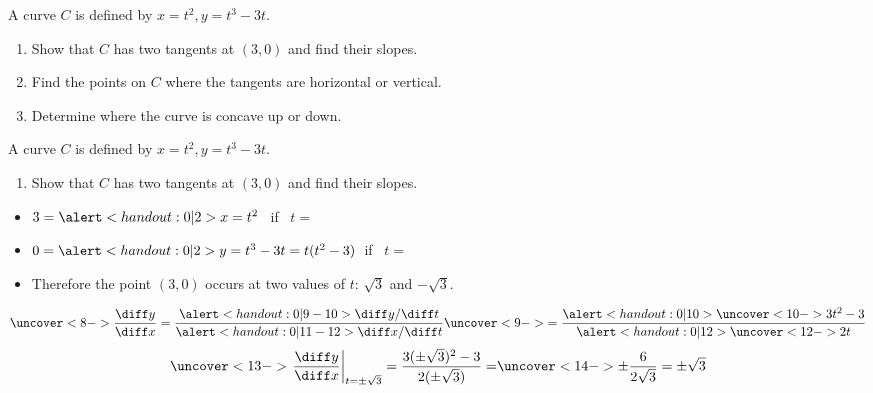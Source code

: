\begin{frame}[t]
\begin{example}[Example 1, p. 667]
A curve $C$ is defined by $x = t^2, y = t^3 - 3t$.
\begin{enumerate}
\item  Show that $C$ has two tangents at $(3,0)$ and find their slopes.
\item  Find the points on $C$ where the tangents are horizontal or vertical.
\item  Determine where the curve is concave up or down.
\end{enumerate}
\end{example}
\end{frame}




\begin{frame}[t]
\begin{example}[Example 1, p. 667]
A curve $C$ is defined by \alert<handout:0| 2>{$x = t^2, y = t^3 - 3t$}.
\begin{enumerate}
\item  Show that $C$ has two tangents at $(3,0)$ and find their slopes.
\end{enumerate}
\begin{itemize}
\item<2-| alert@3-4>  $3 = \alert<handout:0| 2>{x = t^2}$ \ if \ $t = $ 
\item<2-| alert@5-6>  $0 = \alert<handout:0| 2>{y = t^3 - 3t} = t(t^2-3)$\  if \ $t = $ 
\item<7->  Therefore the point $(3,0)$ occurs at two values of $t$: $\sqrt{3}$ and $-\sqrt{3}$.
\end{itemize}
\abovedisplayskip=0pt
\belowdisplayskip=0pt
\[
\uncover<8->{%
\frac{\diff y}{\diff x} = \frac{\alert<handout:0| 9-10>{\diff y / \diff t}}{\alert<handout:0| 11-12>{\diff x / \diff t}} %
}%
\uncover<9->{%
 = \frac{\alert<handout:0| 10>{\uncover<10->{3t^2-3 }}}{\alert<handout:0| 12>{\uncover<12->{2t }}}%
}%
\]
%
\abovedisplayskip=0pt
\belowdisplayskip=0pt
\[
\uncover<13->{%
\left. \frac{\diff y}{\diff x} \right|_{t = \pm \sqrt{3}} = \frac{3(\pm \sqrt{3})^2 - 3}{2(\pm \sqrt{3})} = %
}%
\uncover<14->{%
\pm \frac{6}{2\sqrt{3}} = \pm \sqrt{3}%
}%
\]
%
\end{example}
\end{frame}



